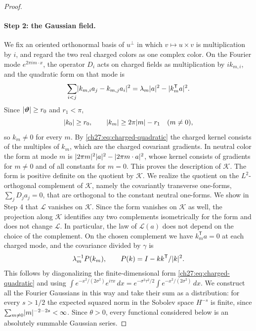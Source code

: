 \begin{proof}
\paragraph{Step 2: the Gaussian field.}
We fix an oriented orthonormal basis of $u^\perp$ in which $v\mapsto u\times v$ is multiplication by $i$, and regard the two real charged colors as one complex color. On the Fourier mode $e^{2\pi im\cdot x}$, the operator $D_i$ acts on charged fields as multiplication by $ik_{m,i}$, and the quadratic form on that mode is
\begin{equation}\label{ch27:eq:charged-quadratic}
 \sum_{i<j}\lvert k_{m,i}a_j-k_{m,j}a_i\rvert^2=\lambda_m\lvert a\rvert^2-\lvert k_m^{\mathsf T}a\rvert^2.
\end{equation}
Since $\lvert \bm\vartheta\rvert\ge r_0$ and $r_1<\pi$,
\[
 \lvert k_0\rvert\ge r_0,\qquad\lvert k_m\rvert\ge2\pi\lvert m\rvert-r_1\quad(m\ne0),
\]
so $k_m\ne0$ for every $m$. By \eqref{ch27:eq:charged-quadratic} the charged kernel consists of the multiples of $k_m$, which are the charged covariant gradients. In neutral color the form at mode $m$ is $\lvert 2\pi m\rvert^2\lvert a\rvert^2-\lvert 2\pi m\cdot a\rvert^2$, whose kernel consists of gradients for $m\ne0$ and of all constants for $m=0$. This proves the description of $\mathcal K$. The form is positive definite on the quotient by $\mathcal K$. We realize the quotient on the $L^2$-orthogonal complement of $\mathcal K$, namely the covariantly transverse one-forms, $\sum_jD_ja_j=0$, that are orthogonal to the constant neutral one-forms. We show in Step 4 that $\mathcal L$ vanishes on $\mathcal K$. Since the form vanishes on $\mathcal K$ as well, the projection along $\mathcal K$ identifies any two complements isometrically for the form and does not change $\mathcal L$. In particular, the law of $\mathcal L(a)$ does not depend on the choice of the complement. On the chosen complement we have $k_m^{\mathsf T}a=0$ at each charged mode, and the covariance divided by $\gamma$ is
\begin{equation}\label{ch27:eq:charged-covariance}
 \lambda_m^{-1}P(k_m),\qquad P(k)=I-kk^{\mathsf T}/\lvert k\rvert^2.
\end{equation}
This follows by diagonalizing the finite-dimensional form \eqref{ch27:eq:charged-quadratic} and using $\int e^{-x^2/(2\sigma^2)}e^{i\tau x}\,dx=e^{-\sigma^2\tau^2/2}\int e^{-x^2/(2\sigma^2)}\,dx$. We construct all the Fourier Gaussians in this way and take their sum as a distribution: for every $s>1/2$ the expected squared norm in the Sobolev space $H^{-s}$ is finite, since $\sum_{m\ne0}\lvert m\rvert^{-2-2s}<\infty$. Since $\theta>0$, every functional considered below is an absolutely summable Gaussian series.


\end{proof}
